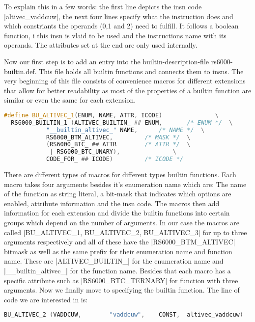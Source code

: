 To explain this in a few words: the first line depicts the insn code |altivec_vaddcuw|, the next four lines specify what the instruction does and which constriants the operands (0,1 and 2) need to fulfill. It follows a boolean function, i this insn is vlaid to be used and the instructions name with its operands. The attributes set at the end are only used internally.

Now our first step is to add an entry into the builtin-description-file rs6000-builtin.def. This file holds all builtin functions and connects them to insns. The very beginning of this file consists of convenience macros for different extensions that allow for better readability as most of the properties of a builtin function are similar or even the same for each extension.
\begin{lstlisting}[language=C++,basicstyle=\ttfamily\scriptsize,keywordstyle=\color{red}]
#define BU_ALTIVEC_1(ENUM, NAME, ATTR, ICODE)				\
  RS6000_BUILTIN_1 (ALTIVEC_BUILTIN_ ## ENUM,		/* ENUM */	\
  		    "__builtin_altivec_" NAME,		/* NAME */	\
  		    RS6000_BTM_ALTIVEC,			/* MASK */	\
  		    (RS6000_BTC_ ## ATTR		/* ATTR */	\
   		     | RS6000_BTC_UNARY),				\
  		    CODE_FOR_ ## ICODE)			/* ICODE */
\end{lstlisting}
There are different types of macros for different types builtin functions. Each macro takes four arguments besides it's enumeration name which are: The name of the function as string literal, a bit-mask that indicates which options are enabled, attribute information and the insn code.
The macros then add information for each extension and divide the builtin functions into certain groups which depend on the number of arguments. In our case the macros are called |BU_ALTIVEC_1, BU_ALTIVEC_2, BU_ALTIVEC_3| for up to three arguments respectively and all of these have the |RS6000_BTM_ALTIVEC| bitmask as well as the same prefix for their enumeration name and function name. These are |ALTIVEC_BUILTIN_| for the enumeration name and |__builtin_altivec_| for the function name. Besides that each macro has a specific attribute such as |RS6000_BTC_TERNARY| for function with three arguments.
Now we finally move to specifying the builtin function. The line of code we are interested in is:

\begin{lstlisting}[language=C++,basicstyle=\ttfamily\scriptsize,keywordstyle=\color{red}]
BU_ALTIVEC_2 (VADDCUW,	      "vaddcuw",	CONST,	altivec_vaddcuw)
\end{lstlisting}

